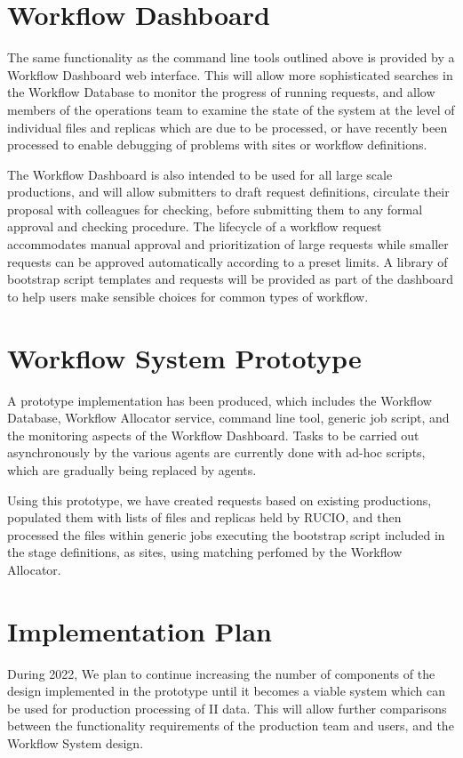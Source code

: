 \documentclass[../main-v1.tex]{subfiles}
\begin{document}
\section{Workflow Dashboard}
\label{sec:flow:dashboard}

The same functionality as the command line tools outlined above is provided by a Workflow Dashboard web interface. This will allow more sophisticated searches in the Workflow Database to monitor the progress of running requests, and allow members of the operations team to examine the state of the system at the level of individual files and replicas which are due to be processed, or have recently been processed to enable debugging of problems with sites or workflow definitions.

The Workflow Dashboard is also intended to be used for all large scale productions, and will allow submitters to draft request definitions, circulate their proposal with colleagues for checking, before submitting them to any formal approval and checking procedure. The lifecycle of a workflow request accommodates manual approval and prioritization of large requests while smaller requests can be approved automatically according to a preset limits. A library of bootstrap script templates and requests will be provided as part of the dashboard to help users make sensible choices for common types of workflow.

\section{Workflow System Prototype}
\label{sec:flow:prototype}

A prototype implementation has been produced, which includes the Workflow Database, Workflow Allocator service, command line tool, generic job script, and the monitoring aspects of the Workflow Dashboard. Tasks to be carried out asynchronously by the various agents are currently done with ad-hoc scripts, which are gradually being replaced by agents.

Using this prototype, we have created requests based on existing productions, populated them with lists of files and replicas held by RUCIO, and then processed the files within generic jobs executing the bootstrap script included in the stage definitions, as sites, using matching perfomed by the Workflow Allocator.

\section{Implementation Plan }
\label{sec:flow:implementation}

During 2022, We plan to continue increasing the number of components of the design implemented in the prototype until it becomes a viable system which can be used for production processing of  II data. This will allow further comparisons between the functionality requirements of the production team and users, and the Workflow System design.

\end{document}
